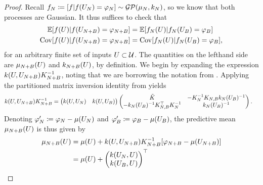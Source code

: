 \documentclass[12pt]{article}
\begin{document}
\begin{proof} 
Recall $\funcEm[\Ndesign] \Def [\func | \func(\designIn[\Ndesign]) = \funcVal[\Ndesign]] \sim \GP(\gpMean[\Ndesign], \gpKer[\Ndesign])$, so we know that 
both processes are Gaussian. It thus suffices to check that 
\begin{align*}
\E[\func(\parMat) | \func(\designIn[\Naugment]) = \funcVal[\Naugment]] 
&= \E[\funcEm[\Ndesign](\parMat) | \funcEm[\Ndesign](\designIn[\Nbatch]) = \funcVal[\Nbatch]] \\
\Cov[\func(\parMat) | \func(\designIn[\Naugment]) = \funcVal[\Naugment]] 
&= \Cov[\funcEm[\Ndesign](\parMat) | \funcEm[\Ndesign](\designIn[\Nbatch]) = \funcVal[\Nbatch]],
\end{align*}
for an arbitrary finite set of inputs $\parMat \subset \parSpace$. The quantities on the lefthand side are 
$\gpMean[\Naugment](\parMat)$ and $\gpKer[\Naugment](\parMat)$, by definition. We begin by expanding 
the expression $\gpKerPrior(\parMat, \designIn[\Naugment]) \kerMat[\Naugment]^{-1}$, noting that we 
are borrowing the notation from . Applying the partitioned matrix 
inversion identity from  yields 
\begin{align*}
\gpKerPrior(\parMat, \designIn[\Naugment]) \kerMat[\Naugment]^{-1}
&= \begin{pmatrix} \gpKerPrior(\parMat, \designIn[\Ndesign]) &  \gpKerPrior(\parMat, \designIn[\Nbatch]) \end{pmatrix}
\begin{pmatrix} \tilde{K} & -\kerMat[\Ndesign]^{-1} \kerMat[\Ndesign,\Nbatch] \gpKer[\Ndesign](\designBatchIn)^{-1} \\
-\gpKer[\Ndesign](\designBatchIn)^{-1} \kerMat[\Ndesign,\Nbatch]^\top  \kerMat[\Ndesign]^{-1} & \gpKer[\Ndesign](\designBatchIn)^{-1} \end{pmatrix}.
\end{align*}
Denoting $\funcVal[\Ndesign]^\prime \Def \funcVal[\Ndesign] - \gpMeanPrior(\designIn[\Ndesign])$ and 
$\funcVal[\Nbatch]^\prime \Def \funcVal[\Nbatch] - \gpMeanPrior(\designIn[\Nbatch])$, the predictive mean $\gpMean[\Naugment](\parMat)$ is thus given by 
\begin{align*}
\gpMean[\Naugment](\parMat)
&= \gpMeanPrior(\parMat) + \gpKerPrior(\parMat, \designIn[\Naugment]) \kerMat[\Naugment]^{-1}[\funcVal[\Naugment] - \gpMeanPrior(\designIn[\Naugment])] \\
&= \gpMeanPrior(\parMat) + \begin{pmatrix} \gpKerPrior(\designIn[\Ndesign], \parMat) \\  \gpKerPrior(\designIn[\Nbatch], \parMat) \end{pmatrix}^\top

\end{align*}
\end{proof}
\end{document}
